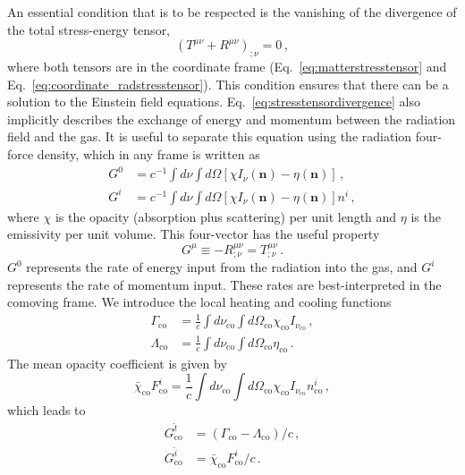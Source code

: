 \documentclass[../main.tex]{subfiles}
\begin{document}
An essential condition that is to be respected is the vanishing of the divergence of the total stress-energy tensor,
\begin{equation}\label{eq:stresstensordivergence}
    (T^{\mu\nu}+R^{\mu\nu})_{;\nu}=0\,,
\end{equation}
where both tensors are in the coordinate frame (Eq.~\ref{eq:matterstresstensor} and Eq.~\ref{eq:coordinate_radstresstensor}). This condition ensures that there can be a solution to the Einstein field equations.  Eq.~\eqref{eq:stresstensordivergence} also implicitly describes the exchange of energy and momentum between the radiation field and the gas. It is useful to separate this equation using the radiation four-force density, which in any frame is written as \citep{MihalasMihalas1984}
\begin{align}
    G^0&=c^{-1}\int d\nu\int d\Omega[\chi I_\nu(\bm{n})-\eta(\bm{n})]\,,\\ 
    G^i&=c^{-1}\int d\nu\int d\Omega[\chi I_\nu(\bm{n})-\eta(\bm{n})]n^i\,,
\end{align}
where $\chi$ is the opacity (absorption plus scattering) per unit length and $\eta$ is the emissivity per unit volume. This four-vector has the useful property
\begin{equation}
    G^\mu\equiv -R^{\mu\nu}_{;\nu}=T^{\mu\nu}_{;\nu}\,.
\end{equation}
$G^0$ represents the rate of energy input from the radiation into the gas, and $G^i$ represents the rate of momentum input.  These rates are best-interpreted in the comoving frame. We introduce the local heating and cooling functions
\begin{align}
    \Gamma_\text{co}&=\frac{1}{c}\int d\nu_\text{co}\int d\Omega_\text{co}\chi_\text{co}I_{\nu_\text{co}}\,,\\
    \Lambda_\text{co}&=\frac{1}{c}\int d\nu_\text{co}\int d\Omega_\text{co}\eta_\text{co}\,.
\end{align}
 The mean opacity coefficient is given by
\begin{equation}
    \bar{\chi}_\text{co}F^i_\text{co}=\frac{1}{c}\int d\nu_\text{co}\int d\Omega_\text{co}\chi_\text{co}I_{\nu_\text{co}}n^i_\text{co}\,,
\end{equation}
which leads to
\begin{align}
    G^{\hat{t}}_\text{co}&=(\Gamma_\text{co}-\Lambda_\text{co})/c\,,\label{eq:G_co^t}\\
    G^{\hat{i}}_\text{co}&=\bar{\chi}_\text{co}F^i_\text{co}/c \,.\label{eq:G_co^i}
\end{align}
\end{document}
